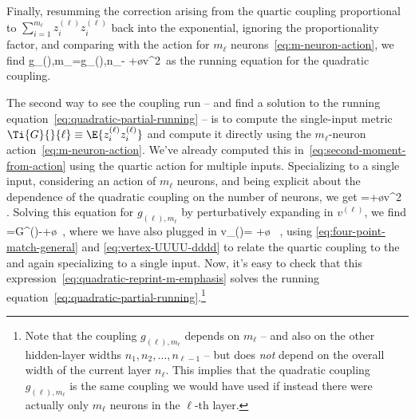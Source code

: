 Finally,
resumming the correction arising from the quartic coupling proportional to $\sum_{i=1}^{m_{\ell}}z_{i}^{(\ell)}z_{i}^{(\ell)}$ back into the exponential, ignoring the proportionality factor, and comparing with the action for $m_{\ell}$ neurons~\eqref{eq:m-neuron-action}, we find
\be\label{eq:quadratic-partial-running}
g_{(\ell),m_{\ell}}=g_{(\ell),n_{\ell}}- +\o{v^2}\, 
\ee
as the running equation for the quadratic coupling.

The second way to see the coupling run -- and find a solution to the running equation~\eqref{eq:quadratic-partial-running} -- is to compute the single-input metric $\Ti{G}{}{\ell}\equiv\E{z_{i}^{(\ell)}z_{i}^{(\ell)}}$ and compute it directly using the $m_{\ell}$-neuron action~\eqref{eq:m-neuron-action}.
We've already computed this in~\eqref{eq:second-moment-from-action} using the quartic action for multiple inputs. Specializing to a single input, considering an action of $m_\ell$ neurons, and being explicit about the dependence of the quadratic coupling on the number of neurons, we get
\be\label{eq:second-moment-from-partial-action}
=+\o{v^2}\, .
\ee
Solving this equation for $g_{(\ell),m_{\ell}}$ by perturbatively expanding in $v^{(\ell)}$, we find 
\be\label{eq:quadratic-reprint-m-emphasis}
=G^{(\ell)}-+\o{}\, ,
\ee
where we have also plugged in
\be\label{eq:quartic-single-input-coupling-for-vertex}
v_{(\ell)}= +\o{} \, ,
\ee
using \eqref{eq:four-point-match-general} and \eqref{eq:vertex-UUUU-dddd} to relate the quartic coupling to the  and again specializing to a single input.
Now, it's easy to check that this expression~\eqref{eq:quadratic-reprint-m-emphasis} solves the running equation~\eqref{eq:quadratic-partial-running}.\footnote{Note that the coupling $g_{(\ell),m_{\ell}}$ depends on $m_{\ell}$ -- and also on the other hidden-layer widths $n_{1},n_{2},\ldots,n_{\ell-1}$ -- but does \emph{not} depend on the overall width of the current layer $n_{\ell}$. This implies that the quadratic coupling $g_{(\ell),m_{\ell}}$ is the same coupling we would have used if instead there were actually only $m_{\ell}$ neurons in the $\ell$-th layer. 
} 

